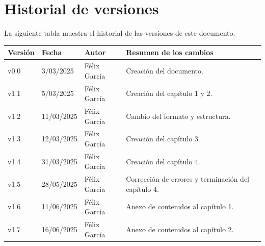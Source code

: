 \chapter{Historial de versiones}
La siguiente tabla muestra el historial de las versiones de este documento.

\begin{table}[h!]
    \centering
    \begin{tabular}{p{1.5cm} p{2cm} p{5cm} p{9cm}}
        Versión & Fecha & Autor & Resumen de los cambios \\ \hline
        v0.0 & 3/03/2025 & F\'elix Garc\'ia & Creación del documento. \\
        v1.1 & 5/03/2025 & F\'elix Garc\'ia & Creación del cap\'itulo 1 y 2. \\
        v1.2 & 11/03/2025 & F\'elix Garc\'ia & Cambio del formato y estructura. \\
        v1.3 & 12/03/2025 & F\'elix Garc\'ia & Creaci\'on del cap\'itulo 3. \\
        v1.4 & 31/03/2025 & F\'elix Garc\'ia & Creaci\'on del cap\'itulo 4. \\
        v1.5 & 28/05/2025 & F\'elix Garc\'ia & Correcci\'on de errores y terminaci\'on del cap\'itulo 4. \\
        v1.6 & 11/06/2025 & F\'elix Garc\'ia & Anexo de contenidos al cap\'itulo 1. \\
        v1.7 & 16/06/2025 & F\'elix Garc\'ia & Anexo de contenidos al cap\'itulo 2. \\
    \end{tabular}
\end{table}